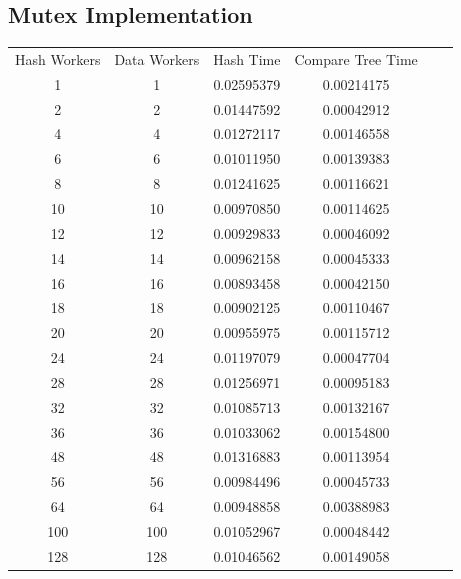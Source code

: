 \documentclass[letterpaper,12pt]{article}
\theoremstyle{remark}
\begin{document}
\subsection*{Mutex Implementation}
\begin{tabular}{cccccc}

    Hash Workers & Data Workers & Hash Time & Compare Tree Time \\
1 & 1  & 0.02595379 & 0.00214175  \\
2 & 2  & 0.01447592 & 0.00042912  \\
4 & 4  & 0.01272117 & 0.00146558  \\
6 & 6  & 0.01011950 & 0.00139383  \\
8 & 8  & 0.01241625 & 0.00116621  \\
10 & 10 & 0.00970850 & 0.00114625  \\
12 & 12 & 0.00929833 & 0.00046092  \\
14 & 14 & 0.00962158 & 0.00045333  \\
16 & 16 & 0.00893458 & 0.00042150  \\
18 & 18 & 0.00902125 & 0.00110467  \\
20 & 20 & 0.00955975 & 0.00115712  \\
24 & 24 & 0.01197079 & 0.00047704  \\
28 & 28 & 0.01256971 & 0.00095183  \\
32 & 32 & 0.01085713 & 0.00132167  \\
36 & 36 & 0.01033062 & 0.00154800  \\
48 & 48 & 0.01316883 & 0.00113954  \\
56 & 56 & 0.00984496 & 0.00045733  \\
64 & 64 & 0.00948858 & 0.00388983  \\
100 & 100 & 0.01052967 & 0.00048442  \\
128 & 128 & 0.01046562 & 0.00149058  \\

\end{tabular}
\end{document}
